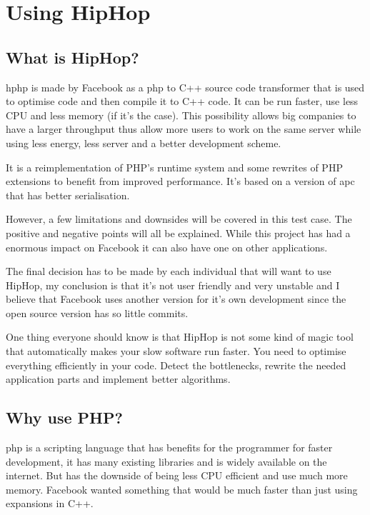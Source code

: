 \section{Using HipHop}\label{sec:using_hiphop}
\subsection{What is HipHop?}
\gls{hphp} is made by Facebook as a \gls{php} to C++ source code transformer that is used to optimise code and then compile it to C++ code.
It can be run faster, use less CPU and less memory (if it's the case). 
This possibility allows big companies to have a larger throughput thus allow more users to work on the same server while using less energy, less server and a better development scheme.

It is a reimplementation of PHP's runtime system\cite{facebook_devs} and some rewrites of PHP extensions to benefit from improved performance.
It's based on a version of \gls{apc} that has better serialisation.

However, a few limitations and downsides will be covered in this test case. The positive and negative points will all be explained. 
While this project has had a enormous impact on Facebook it can also have one on other applications.

The final decision has to be made by each individual that will want to use HipHop,
my conclusion is that it's not user friendly and very unstable and I believe that Facebook uses another version for it's own development since the open source version has so little commits.

One thing everyone should know is that HipHop is not some kind of magic tool that automatically makes your slow software run faster. You need to optimise everything efficiently in your code. Detect the bottlenecks, rewrite the needed application parts and implement better algorithms.

\subsection{Why use PHP?}
\gls{php} is a scripting language that has benefits for the programmer for faster development, it has many existing libraries and is widely available on the internet. But has the downside of being less CPU efficient and use much more memory.
Facebook wanted something that would be much faster than just using expansions in C++.

